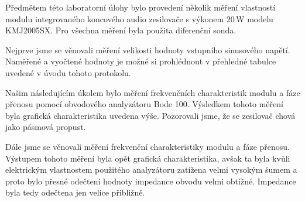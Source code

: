 \documentclass[a4paper, czech]{article}
\begin{document}
Předmětem této laboratorní úlohy bylo provedení několik měření vlastností modulu integrovaného
koncového audio zesilovače s výkonem 20\,W modelu KMJ2005SX. Pro všechna měření byla použita
diferenční sonda.

Nejprve jsme se věnovali měření velikosti hodnoty vstupního sinusového napětí.
Naměřené a vyočtené hodnoty je možné si prohlédnout v přehledné tabulce uvedené v
úvodu tohoto protokolu.

Našim následujícím úkolem bylo měření frekvenčních charakteristik modulu a fáze přenosu
pomocí obvodového analyzátoru Bode 100. Výsledkem tohoto měření byla grafická charakteristika
uvedena výše. Pozorovali jsme, že se zesilovač chová jako pásmová propust.

Dále jsme se věnovali měření frekvenční charakteristiky modulu a fáze přenosu.
Výstupem tohoto měření byla opět grafická charakteristika, avšak ta byla kvůli elektrickým
vlastnostem použitého analyzátoru zatížena velmi vysokým šumem a proto bylo přesné
odečtení hodnoty impedance obvodu velmi obtížné. Impedance byla tedy odečtena jen velice přibližně.

\end{document}
